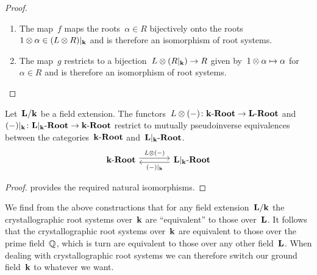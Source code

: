 \begin{proof}
  \leavevmode
  \begin{enumerate}
    \item
      The map~$f$ maps the roots~$\alpha \in R$ bijectively onto the roots~$1 \tensor \alpha \in \restrict{(L \tensor R)}{\kf}$ and is therefore an isomorphism of root systems.
    \item
      The map~$g$ restricts to a bijection~$L \tensor (\restrict{R}{\kf}) \to R$ given by~$1 \otimes \alpha \mapsto \alpha$ for~$\alpha \in R$ and is therefore an isomorphism of root systems.
    \qedhere
  \end{enumerate}
\end{proof}


\begin{corollary}
  Let~$\mathbf{L}/\mathbf{k}$ be a field extension.
  The functors~$L \otimes (-) \colon \mathbf{k}\text{-}\mathbf{Root} \to \mathbf{L}\text{-}\mathbf{Root}$ and~$\restrict{(-)}{\kf} \colon \cRoot{\restrict{\Lf}{\kf}} \to \cRoot{\kf}$ restrict to mutually pseudoinverse equivalences between the categories~$\mathbf{k}\text{-}\mathbf{Root}$ and~$\cRoot{\restrict{\Lf}{\kf}}$.
  \[
    \begin{tikzcd}[column sep = large]
      \cRoot{\kf}
      \arrow[shift left]{r}[above]{L \tensor (-)}
      &
      \cRoot{\restrict{\Lf}{\kf}}
      \arrow[shift left]{l}[below]{\restrict{(-)}{\kf}}
    \end{tikzcd}
  \]
\end{corollary}


\begin{proof}
   provides the required natural isomorphisms.
\end{proof}


\begin{remark}
  We find from the above constructions that for any field extension~$\mathbf{L}/\mathbf{k}$ the crystallographic root systems over~$\mathbf{k}$ are \enquote{equivalent} to those over~$\mathbf{L}$.
  It follows that the crystallographic root systems over~$\mathbf{k}$ are equivalent to those over the prime field~$\mathbb{Q}$, which is turn are equivalent to those over any other field~$\mathbf{L}$.
  When dealing with crystallographic root systems we can therefore switch our ground field~$\mathbf{k}$ to whatever we want.
\end{remark}



